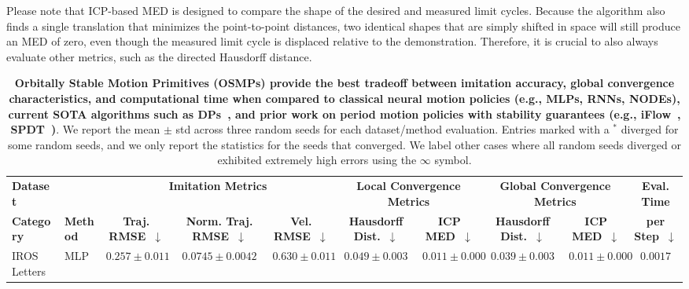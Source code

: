 Please note that \gls{ICP}-based \gls{MED} is designed to compare the shape of the desired and measured limit cycles. Because the algorithm also finds a single translation that minimizes the point-to-point distances, two identical shapes that are simply shifted in space will still produce an MED of zero, even though the measured limit cycle is displaced relative to the demonstration.
Therefore, it is crucial to also always evaluate other metrics, such as the directed Hausdorff distance.

\begin{table}[htbp]\centering
    \centering
    \caption{\textbf{Orbitally Stable Motion Primitives (\glspl{OSMP}) provide the best tradeoff between imitation accuracy, global convergence characteristics, and computational time when compared to classical neural motion policies (e.g., \glspl{MLP}, \glspl{RNN}, \glspl{NODE}), current SOTA algorithms such as \glspl{DP}~\citep{chi2023diffusion}, and prior work on period motion policies with stability guarantees (e.g., iFlow~\citep{urain2020imitationflow}, \gls{SPDT}~\citep{zhi2024teaching})}. We report the mean $\pm$ std across three random seeds for each dataset/method evaluation. Entries marked with a $^*$ diverged for some random seeds, and we only report the statistics for the seeds that converged. We label other cases where all random seeds diverged or exhibited extremely high errors using the \emph{$\infty$} symbol.}
    \label{tab:osmp:benchmarking_quantitative_results} %
    \setlength{\tabcolsep}{2.0pt}   %
    \renewcommand{\arraystretch}{1.2} %
    \begin{tiny}
    \begin{tabular}{|l|l|ccc|cc|cc|c|}   %
    \toprule
    \textbf{Dataset} & & \multicolumn{3}{c|}{\textbf{Imitation Metrics}} & \multicolumn{2}{c|}{\textbf{Local Convergence Metrics}} & \multicolumn{2}{c|}{\textbf{Global Convergence Metrics}} & \textbf{Eval. Time}\\
    \textbf{Category} & \textbf{Method} & \textbf{Traj. RMSE~$\downarrow$} & \textbf{Norm. Traj. \gls{RMSE}~$\downarrow$} & \textbf{Vel. RMSE~$\downarrow$} & \textbf{Hausdorff Dist.~$\downarrow$} & \textbf{\gls{ICP} \gls{MED}~$\downarrow$} & \textbf{Hausdorff Dist.~$\downarrow$} & \textbf{\gls{ICP} \gls{MED}~$\downarrow$} & \textbf{per Step~$\downarrow$}\\
    \midrule
    \multirow{8}{*}{IROS Letters} & MLP & $0.257 \pm 0.011$ & $0.0745 \pm 0.0042$ & $0.630 \pm 0.011$ & $0.049 \pm 0.003$ & $0.011 \pm 0.000$ & $0.039 \pm 0.003$ & $0.011 \pm 0.000$ & $0.0017$\\

\end{tabular}
\end{tiny}
\end{table}
